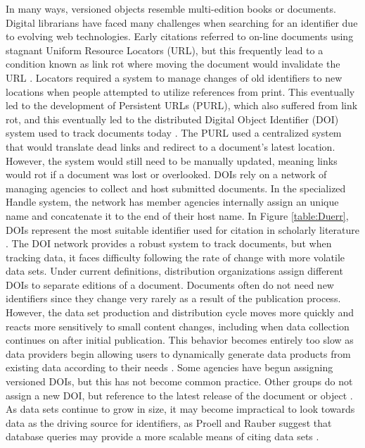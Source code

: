 In many ways, versioned objects resemble multi-edition books or documents.
Digital librarians have faced many challenges when searching for an identifier due to evolving web technologies.
Early citations referred to on-line documents using stagnant Uniform Resource Locators (URL), but this frequently lead to a condition known as link rot where moving the document would invalidate the URL \cite{Lyons2005}.
Locators required a system to manage changes of old identifiers to new locations when people attempted to utilize references from print.
This eventually led to the development of Persistent URLs (PURL), which also suffered from link rot, and this eventually led to the distributed Digital Object Identifier (DOI) system used to track documents today \cite{Duerr2011}.
The PURL used a centralized system that would translate dead links and redirect to a document's latest location.
However, the system would still need to be manually updated, meaning links would rot if a document was lost or overlooked.
DOIs rely on a network of managing agencies to collect and host submitted documents.
In the specialized Handle system, the network has member agencies internally assign an unique name and concatenate it to the end of their host name.
In Figure \ref{table:Duerr}, DOIs represent the most suitable identifier used for citation in scholarly literature \cite{Duerr2011}.
The DOI network provides a robust system to track documents, but when tracking data, it faces difficulty following the rate of change with more volatile data sets.
Under current definitions, distribution organizations assign different DOIs to separate editions of a document.
Documents often do not need new identifiers since they change very rarely as a result of the publication process.
However, the data set production and distribution cycle moves more quickly and reacts more sensitively to small content changes, including when data collection continues on after initial publication.
This behavior becomes entirely too slow as data providers begin allowing users to dynamically generate data products from existing data according to their needs \cite{Barkstrom2003a}.
Some agencies have begun assigning versioned DOIs, but this has not become common practice.
Other groups do not assign a new DOI, but reference to the latest release of the document or object \cite{Ands2017}.
As data sets continue to grow in size, it may become impractical to look towards data as the driving source for identifiers, as Proell and Rauber suggest that database queries may provide a more scalable means of citing data sets \cite{proellBigData}.

